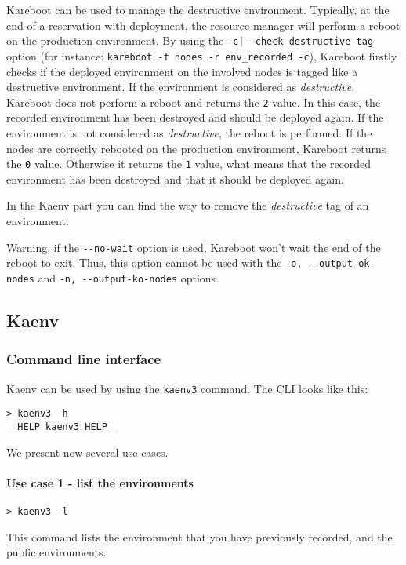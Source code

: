 \documentclass[a4wide,10pt,oneside]{book}
\begin{document}
Kareboot can be used to manage the destructive environment. Typically, at the end of a reservation with deployment, the resource manager will perform a reboot on the production environment. By using the \texttt{-c|-{}-check-destructive-tag} option (for instance: \texttt{kareboot -f nodes -r env\_recorded -c}), Kareboot firstly checks if the deployed environment on the involved nodes is tagged like a destructive environment. If the environment is considered as \textit{destructive}, Kareboot does not perform a reboot and returns the \texttt{2} value. In this case, the recorded environment has been destroyed and should be deployed again. If the environment is not considered as \textit{destructive}, the reboot is performed. If the nodes are correctly rebooted on the production environment, Kareboot returns the \texttt{0} value. Otherwise it returns the \texttt{1} value, what means that the recorded environment has been destroyed and that it should be deployed again.

In the Kaenv part you can find the way to remove the \textit{destructive} tag of an environment.

Warning, if the \texttt{-{}-no-wait} option is used, Kareboot won't wait the end of the reboot to exit. Thus, this option cannot be used with the \texttt{-o, -{}-output-ok-nodes} and \texttt{-n, -{}-output-ko-nodes} options.


\subsection{Kaenv}\label{sec:kaenv}
\subsubsection{Command line interface}
Kaenv can be used by using the \texttt{kaenv3} command. The CLI looks like this:
\begin{small}
\begin{verbatim}
> kaenv3 -h
__HELP_kaenv3_HELP__
\end{verbatim}
\end{small}

We present now several use cases.
\paragraph{Use case 1 - list the environments}
\begin{verbatim}
> kaenv3 -l
\end{verbatim}
This command lists the environment that you have previously recorded, and the public environments.
\end{document}
